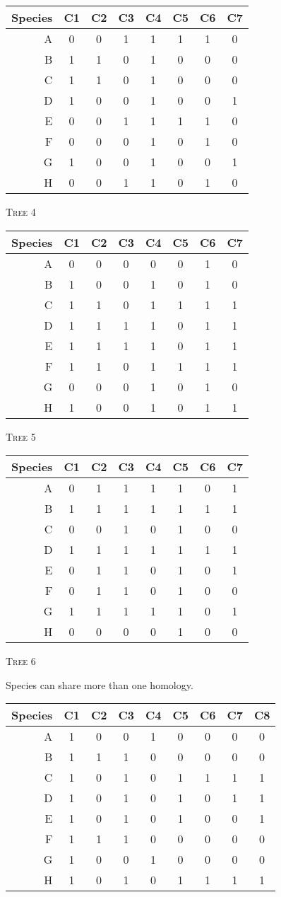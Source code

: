 \documentclass[12pt]{article}
\begin{document}
\begin{longtable}[l]{@{}rccccccc@{}}
\toprule
Species	& C1	& C2	& C3	& C4	& C5	& C6	& C7 \tabularnewline
\midrule
A 		& 0 	& 0 	& 1 	& 1		& 1 	& 1 	& 0  \tabularnewline
B 		& 1 	& 1 	& 0 	& 1 	& 0 	& 0 	& 0  \tabularnewline
C 		& 1 	& 1 	& 0 	& 1 	& 0 	& 0 	& 0  \tabularnewline
D 		& 1 	& 0 	& 0 	& 1 	& 0 	& 0 	& 1  \tabularnewline
E 		& 0 	& 0 	& 1 	& 1 	& 1 	& 1 	& 0  \tabularnewline
F 		& 0 	& 0 	& 0 	& 1 	& 0 	& 1 	& 0  \tabularnewline
G 		& 1 	& 0 	& 0 	& 1 	& 0 	& 0 	& 1  \tabularnewline
H 		& 0 	& 0 	& 1 	& 1 	& 0 	& 1 	& 0  \tabularnewline
\bottomrule
\end{longtable}

\quad

\textsc{Tree 4}

\begin{longtable}[l]{@{}rccccccc@{}}
\toprule
Species	& C1	& C2	& C3	& C4	& C5	& C6	& C7 \tabularnewline
\midrule
A 		& 0 	& 0 	& 0 	& 0		& 0 	& 1 	& 0  \tabularnewline
B 		& 1 	& 0 	& 0 	& 1 	& 0 	& 1 	& 0  \tabularnewline
C 		& 1 	& 1 	& 0 	& 1 	& 1 	& 1 	& 1  \tabularnewline
D 		& 1 	& 1 	& 1 	& 1 	& 0 	& 1 	& 1  \tabularnewline
E 		& 1 	& 1 	& 1 	& 1 	& 0 	& 1 	& 1  \tabularnewline
F 		& 1 	& 1 	& 0 	& 1 	& 1 	& 1 	& 1  \tabularnewline
G 		& 0 	& 0 	& 0 	& 1 	& 0 	& 1 	& 0  \tabularnewline
H 		& 1 	& 0 	& 0 	& 1 	& 0 	& 1 	& 1  \tabularnewline
\bottomrule
\end{longtable}

\quad

\textsc{Tree 5}

\begin{longtable}[l]{@{}rccccccc@{}}
\toprule
Species	& C1	& C2	& C3	& C4	& C5	& C6	& C7 \tabularnewline
\midrule
A 		& 0 	& 1 	& 1 	& 1		& 1 	& 0 	& 1  \tabularnewline
B 		& 1 	& 1 	& 1 	& 1 	& 1 	& 1 	& 1  \tabularnewline
C 		& 0 	& 0 	& 1 	& 0 	& 1 	& 0 	& 0  \tabularnewline
D 		& 1 	& 1 	& 1 	& 1 	& 1 	& 1 	& 1  \tabularnewline
E 		& 0 	& 1 	& 1 	& 0 	& 1 	& 0 	& 1  \tabularnewline
F 		& 0 	& 1 	& 1 	& 0 	& 1 	& 0 	& 0  \tabularnewline
G 		& 1 	& 1 	& 1 	& 1 	& 1 	& 0 	& 1  \tabularnewline
H 		& 0 	& 0 	& 0 	& 0 	& 1 	& 0 	& 0  \tabularnewline
\bottomrule
\end{longtable}

\quad

\textsc{Tree 6}

Species can share more than one homology.

\begin{longtable}[l]{@{}rcccccccc@{}}
\toprule
Species	& C1	& C2	& C3	& C4	& C5	& C6	& C7 & C8 \tabularnewline
\midrule
A 		& 1 	& 0 	& 0 	& 1		& 0 	& 0 	& 0  & 0  \tabularnewline
B 		& 1 	& 1 	& 1 	& 0 	& 0 	& 0 	& 0  & 0  \tabularnewline
C 		& 1 	& 0 	& 1 	& 0 	& 1 	& 1 	& 1  & 1  \tabularnewline
D 		& 1 	& 0 	& 1 	& 0 	& 1 	& 0 	& 1  & 1  \tabularnewline
E 		& 1 	& 0 	& 1 	& 0 	& 1 	& 0 	& 0  & 1  \tabularnewline
F 		& 1 	& 1 	& 1 	& 0 	& 0 	& 0 	& 0  & 0  \tabularnewline
G 		& 1 	& 0 	& 0 	& 1 	& 0 	& 0 	& 0  & 0  \tabularnewline
H 		& 1 	& 0 	& 1 	& 0 	& 1 	& 1 	& 1  & 1  \tabularnewline
\bottomrule
\end{longtable}
\end{document}
